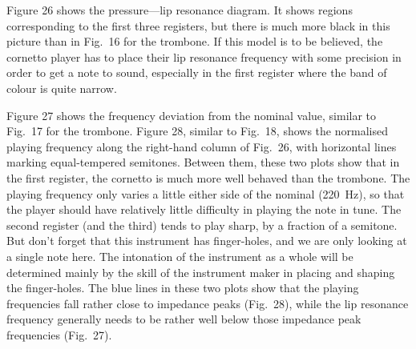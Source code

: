 

  Figure 26 shows the pressure—lip resonance diagram. It shows regions 
  corresponding to the first three registers, but there is much more black in 
  this picture than in Fig.\ 16 for the trombone. If this model is to be 
  believed, the cornetto player has to place their lip resonance frequency with 
  some precision in order to get a note to sound, especially in the first 
  register where the band of colour is quite narrow. 


  Figure 27 shows the frequency deviation from the nominal value, similar to 
  Fig.\ 17 for the trombone. Figure 28, similar to Fig.\ 18, shows the 
  normalised playing frequency along the right-hand column of Fig.\ 26, with 
  horizontal lines marking equal-tempered semitones. Between them, these two 
  plots show that in the first register, the cornetto is much more well behaved 
  than the trombone. The playing frequency only varies a little either side of 
  the nominal (220~Hz), so that the player should have relatively little 
  difficulty in playing the note in tune. The second register (and the third) 
  tends to play sharp, by a fraction of a semitone. But don’t forget that this 
  instrument has finger-holes, and we are only looking at a single note here. 
  The intonation of the instrument as a whole will be determined mainly by the 
  skill of the instrument maker in placing and shaping the finger-holes. The 
  blue lines in these two plots show that the playing frequencies fall rather 
  close to impedance peaks (Fig.\ 28), while the lip resonance frequency 
  generally needs to be rather well below those impedance peak frequencies 
  (Fig.\ 27). 


